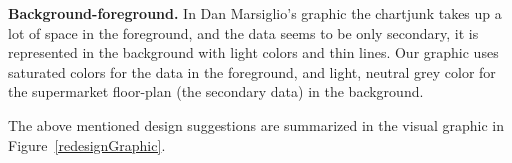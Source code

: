 \textbf{Background-foreground.} In Dan Marsiglio's graphic the chartjunk
takes up a lot of space in the foreground, and the data seems to be only
secondary, it is represented in the background with light colors and thin
lines. Our graphic uses saturated colors for the data in the foreground, and
light, neutral grey color for the supermarket floor-plan (the secondary
data) in the background.

The above mentioned design suggestions are summarized in the visual graphic in
Figure~\ref{redesignGraphic}.
